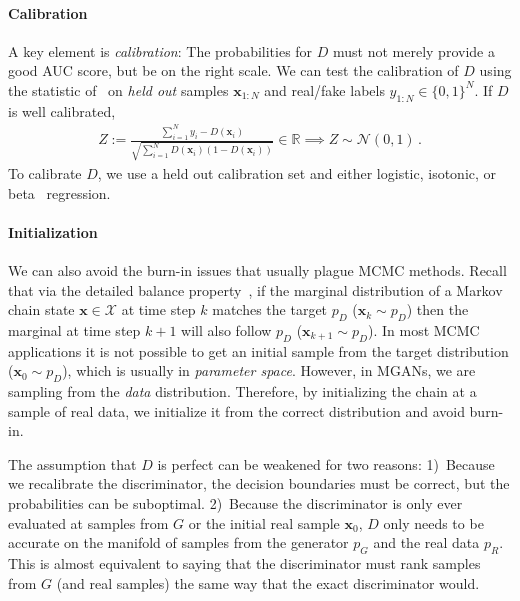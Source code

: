 \documentclass{article}
\renewcommand{\vec}[1]{{\boldsymbol{\mathbf{#1}}}} %
\newcommand{\R}{\mathbb{R}}
\newcommand{\set}[1]{\mathcal{#1}}
\newcommand{\sample}{\sim}
\newcommand{\norm}{\mathcal{N}}
\newcommand{\bern}{\textrm{Bern}}
\newcommand{\PG}{{p_G}}
\newcommand{\PD}{{p_D}}
\newcommand{\PR}{{p_R}}
\newcommand{\setx}{\set{X}}
\begin{document}
\paragraph{Calibration}
A key element is \emph{calibration}: The probabilities for $D$ must not merely provide a good AUC score, but be on the right scale.
We can test the calibration of $D$ using the statistic of~\citet{Dawid1997} on \emph{held out} samples $\vec x_{1:N}$ and real/fake labels $y_{1:N} \in \{0,1\}^N$.
If $D$ is well calibrated, %
\begin{align}
  Z := \frac{\sum_{i=1}^N y_i - D(\vec x_i)}{\sqrt{\sum_{i=1}^N D(\vec x_i) (1 - D(\vec x_i))}} \in \R \implies Z \sample \norm(0,1)\,. \label{eq:calib score}
\end{align}
To calibrate $D$, we use a held out calibration set and either logistic, isotonic, or beta~\citep{Kull2017} regression.

\paragraph{Initialization}
We can also avoid the burn-in issues that usually plague MCMC methods.
Recall that via the detailed balance property~\citep[Ch.~1]{Gilks1996}, if the marginal distribution of a Markov chain state $\vec x \in \setx$ at time step $k$ matches the target $\PD$ ($\vec x_k \sample \PD$) then the marginal at time step $k+1$ will also follow $\PD$ ($\vec x_{k+1} \sample \PD$)\@.
In most MCMC applications it is not possible to get an initial sample from the target distribution ($\vec x_0 \sample \PD$), which is usually in \emph{parameter space}.
However, in MGANs, we are sampling from the \emph{data} distribution.
Therefore, by initializing the chain at a sample of real data, we initialize it from the correct distribution and avoid burn-in.

The assumption that $D$ is perfect can be weakened for two reasons:
1)~Because we recalibrate the discriminator, the decision boundaries must be correct, but the probabilities can be suboptimal.
2)~Because the discriminator is only ever evaluated at samples from $G$ or the initial real sample $\vec x_0$, $D$ only needs to be accurate on the manifold of samples from the generator $\PG$ and the real data $\PR$.
This is almost equivalent to saying that the discriminator must rank samples from $G$ (and real samples) the same way that the exact discriminator would.
\end{document}
